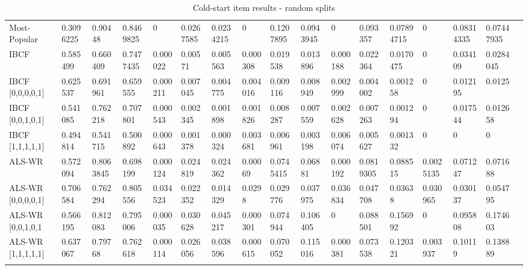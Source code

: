 \begin{table}[H]
{\begin{tabular}{*{17}{l}}
\rowcolor{Gray}
Most-Popular		& 0.3096225 & 0.90448 & 0.8469825 & 0 & 0.0267585 & 0.0234215 & 0 & 0.1207895 & 0.0943945 & 0 & 0.093357 & 0.07894715 & 0 & 0.08314335 & 	0.07447935 & \\
\rowcolor{Gray}
IBCF				& 0.585499 & 0.660409 & 0.7477435 & 0.000022 & 0.00571 & 0.005563 & 0.000308 & 0.019538 & 0.013896 & 0.000188 & 0.022364 & 0.0170475 & 0 & 0.034109 & 0.0284045 & \\ 
IBCF [0,0,0,0,1] 	&	0.625537	&	0.691961	&	0.659555	&	0.000211	&	0.007045	&	0.004775	&	0.004016	&	0.009116	&	0.008949	&	0.002999	&	0.004002	&	0.001258	&	0	&	0.012195	&	0.0125	& \\																														
IBCF [0,0,1,0,1] 	& 0.541085	&	0.762218	&	0.707801	&	0.000543	&	0.002345	&	0.001898	&	0.001826	&	0.008287	&	0.007559	&	0.002628	&	0.007263	&	0.001294	&	0	&	0.017544	&	0.012658	& \\
IBCF [1,1,1,1,1]	 &	0.494814	&	0.541715	&	0.500892	&	0.000643	&	0.001378	&	0.000324	&	0.003681	&	0.006961	&	0.003198	&	0.006074	&	0.005627	&	0.001332	&	0	&	0	&	0	& \\																														
\rowcolor{Gray}
ALS-WR 				&	0.572094& 0.8063845	& 0.698199	& 0.000124	&	0.024819	&	0.024362	&	0.00069	&	0.0745415	&	0.06881	&	0.000192	&	0.0819305	&	0.088515	&	0.0025135	&	0.071247	&	0.071688	& \\
ALS-WR [0,0,0,0,1] &	0.706584	&	0.762294	&	0.805556	&	0.034523	&	0.022352	&	0.014329	&	0.0298	&	0.029776	&	0.037975	&	0.036834	&	0.047708	&	0.03638	&	0.030965	&	0.030137	&	0.054795	&\\																														
ALS-WR [0,0,1,0,1&	0.566195	&	0.812083	&	0.795006	&	0.000035	&	0.030628	&	0.045217	&	0.000301	&	0.074944	&	0.106405	&	0	&	0.088501	&	0.156992	&	0	&	0.095808	&	0.174603	& \\																												
ALS-WR [1,1,1,1,1]	& 0.637067	&	0.79768	&	0.762618	&	0.000114	&	0.026056	&	0.038596	&	0.000615	&	0.070052	&	0.115016	&	0.000381	&	0.073538	&	0.120321	&	0.003937	&	0.10119	&	0.138889	& \\ \\																																																																																		

\bottomrule
\end{tabular}
}
\caption{Cold-start item results - random splits}
\end{table}

